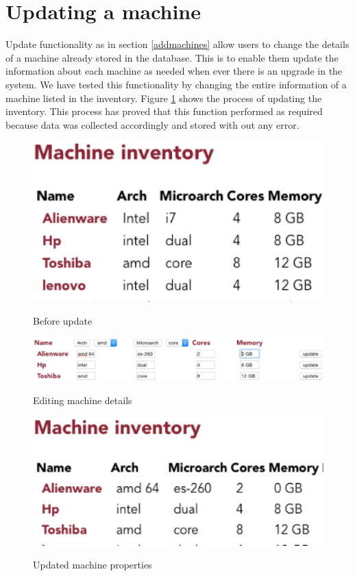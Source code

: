 \section*{Updating a machine}
Update functionality as in section \ref{addmachines} allow users to change the details of a machine already stored in the database. This is to enable them update the information about each machine as needed when ever there is an upgrade in the system. We have tested this functionality by changing the entire information of a machine listed in the inventory. Figure \ref{update} shows the process of updating the inventory. This process has proved that this function performed as required because data was collected accordingly and stored with out any error.
\begin{figure}[h]
  \includegraphics[width=\linewidth]{update.eps}
  \label{update}
  \caption{Before update}
\end{figure}
\begin{figure}[h]
  \includegraphics[width=\linewidth]{change.eps}
  \label{change}
  \caption{Editing machine details}
\end{figure}
\begin{figure}[h]
  \includegraphics[width=\linewidth]{update2.eps}
  \label{update2}
  \caption{Updated machine properties}
\end{figure}
\pagebreak

